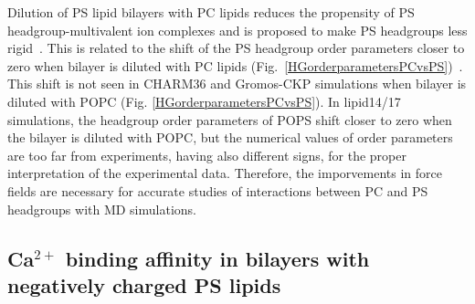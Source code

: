 \documentclass[aps,prl,superscriptaddress,twocolumn]{revtex4}
\begin{document}
Dilution of PS lipid bilayers with PC lipids reduces the propensity
of PS headgroup-multivalent ion complexes and is proposed to make PS
headgroups less rigid~\cite{browning80,buldt81,roux90,roux91}.
This is related to the shift of the PS headgroup order parameters 
closer to zero when bilayer is diluted with PC
lipids (Fig.~\ref{HGorderparametersPCvsPS})~\cite{browning80,scherer87,roux90}.
This shift is not seen in CHARM36 and Gromos-CKP simulations when bilayer is
diluted with POPC (Fig. \ref{HGorderparametersPCvsPS}).
In lipid14/17 simulations, the headgroup order parameters of POPS shift closer
to zero when the bilayer is diluted with POPC, but the numerical values of
order parameters are too far from experiments, having also different signs,
for the proper interpretation of the experimental data.
Therefore, the imporvements in force fields are necessary
for accurate studies of interactions between PC and PS headgroups
with MD simulations.




\subsection{Ca$^{2+}$ binding affinity in bilayers with negatively charged PS lipids}
\end{document}
